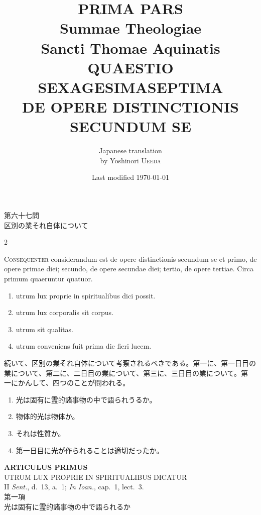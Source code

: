 \documentclass[paper=a4paper,fontsize=10pt,jafontsize=9pt,titlepage]{jlreq}
\title{{\bfseries PRIMA PARS}\\{\Huge Summae Theologiae}\\Sancti Thomae
Aquinatis\\{\sffamily QUAESTIO SEXAGESIMASEPTIMA}\\DE OPERE
DISTINCTIONIS SECUNDUM SE}
\author{Japanese translation\\by Yoshinori {\scshape Ueeda}}
\date{Last modified \today}
\begin{document}
\maketitle
\pagestyle{fancy}

\begin{center}
{\Large 第六十七問\\区別の業それ自体について}
\end{center}

\begin{paracol}{2}

{\scshape Consequenter} considerandum est de opere distinctionis
 secundum se et primo, de opere primae diei; secundo, de opere secundae
 diei; tertio, de opere tertiae. Circa primum quaeruntur quatuor. 

\begin{enumerate}
 \item utrum lux proprie in spiritualibus dici possit.
 \item utrum lux corporalis sit corpus.
 \item utrum sit qualitas.
 \item utrum conveniens fuit prima die fieri lucem.
\end{enumerate}

\switchcolumn

続いて、区別の業それ自体について考察されるべきである。第一に、第一日目の
 業について、第二に、二日目の業について、第三に、三日目の業について。第
 一にかんして、四つのことが問われる。

\begin{enumerate}
 \item 光は固有に霊的諸事物の中で語られうるか。
 \item 物体的光は物体か。
 \item それは性質か。
 \item 第一日目に光が作られることは適切だったか。
\end{enumerate}

\end{paracol}
\newpage
{}
{}
\setcounter{section}{1}
\setcounter{subsection}{0}


\begin{center}
 {\Large {\bfseries ARTICULUS PRIMUS}}\\
 {\large UTRUM LUX PROPRIE IN SPIRITUALIBUS DICATUR}\\
 {\footnotesize II {\itshape Sent.}, d.~13, a.~1; {\itshape In Ioan.},
 cap.~1, lect.~3.}\\
 {\Large 第一項\\光は固有に霊的諸事物の中で語られるか}
\end{center}
\end{document}

